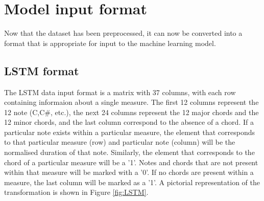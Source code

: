 


\section{Model input format}
Now that the dataset has been preprocessed, it can now be converted into a format that is appropriate for input to the machine learning model.

\subsection{LSTM format}
The LSTM data input format is a matrix with 37 columns, with each row containing informaion about a single measure. The first 12 columns represent the 12 note (C,C\#, etc.), the next 24 columns represent the 12 major chords and the 12 minor chords, and the last column correspond to the absence of a chord. If a particular note exists within a particular measure, the element that corresponds to that particular measure (row) and particular note (column) will be the normalised duration of that note. Similarly, the element that corresponds to the chord of a particular measure will be a '1'. Notes and chords that are not present within that measure will be marked with a '0'. If no chords are present within a measure, the last column will be marked as a '1'. A pictorial representation of the transformation is shown in Figure \ref{fig:LSTM}.

